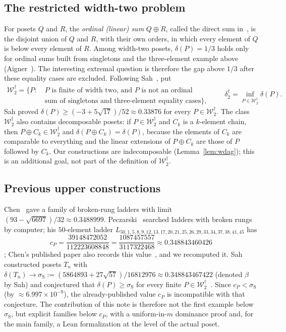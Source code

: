 \documentclass[11pt]{amsart}
\theoremstyle{definition}
\theoremstyle{remark}
\newcommand{\Wdag}{\mathcal{W}_2^{\dagger}}
\newcommand{\deltadag}{\delta_2^{\dagger}}
\begin{document}
\subsection*{The restricted width-two problem}
For posets $Q$ and $R$, the \emph{ordinal (linear) sum} $Q\oplus R$, called the direct sum in~\cite{Sah21}, is the disjoint union of $Q$ and $R$, with their own orders, in which every element of $Q$ is below every element of $R$. Among width-two posets, $\delta(P)=1/3$ holds only for ordinal sums built from singletons and the three-element example above (Aigner~\cite{Aig85}). The interesting extremal question is therefore the gap above $1/3$ after these equality cases are excluded. Following Sah~\cite{Sah21}, put
\[
\begin{aligned}
\Wdag=\bigl\{P:\ &P\text{ is finite of width two, and $P$ is not an ordinal}\\
&\text{sum of singletons and three-element equality cases}\bigr\},
\end{aligned}
\qquad
\deltadag=\inf_{P\in\Wdag}\delta(P).
\]
Sah proved $\delta(P)\ge(-3+5\sqrt{17})/52\approx0.33876$ for every $P\in\Wdag$. The class $\Wdag$ also contains decomposable posets: if $P\in\Wdag$ and $C_k$ is a $k$-element chain, then $P\oplus C_k\in\Wdag$ and $\delta(P\oplus C_k)=\delta(P)$, because the elements of $C_k$ are comparable to everything and the linear extensions of $P\oplus C_k$ are those of $P$ followed by $C_k$. Our constructions are indecomposable (Lemma~\ref{lem:wdag}); this is an additional goal, not part of the definition of $\Wdag$.

\subsection*{Previous upper constructions}
Chen~\cite{Chen18} gave a family of broken-rung ladders with limit $(93-\sqrt{6697})/32\approx0.3488999$. Peczarski~\cite{Pec19} searched ladders with broken rungs by computer; his $50$-element ladder $L_{50,1,5,8,9,12,13,17,20,21,25,26,29,33,34,37,38,41,45}$ has
\[
c_P=\frac{39148472052}{112223608848}=\frac{1087457557}{3117322468}\approx0.348843460426
\]
\cite[Table~2]{Pec19}; Chen's published paper also records this value~\cite[\S1.4]{Chen18}, and we recomputed it. Sah~\cite{Sah21} constructed posets $T_n$ with $\delta(T_n)\to\sigma_{\mathrm S}:=(5864893+27\sqrt{57})/16812976\approx0.348843467422$ (denoted $\beta$ by Sah) and conjectured that $\delta(P)\ge\sigma_{\mathrm S}$ for every finite $P\in\Wdag$~\cite[Conj.~5.1]{Sah21}. Since $c_P<\sigma_{\mathrm S}$ (by $\approx6.997\times10^{-9}$), the already-published value $c_P$ is incompatible with that conjecture. The contribution of this note is therefore not the first example below $\sigma_{\mathrm S}$, but explicit families below $c_P$, with a uniform-in-$m$ dominance proof and, for the main family, a Lean formalization at the level of the actual poset.
\end{document}

